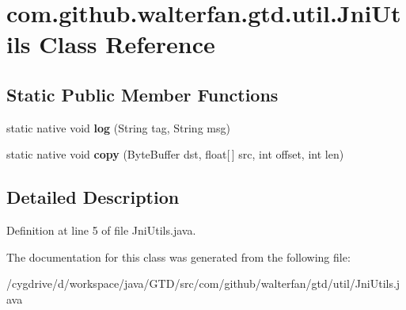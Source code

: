 \hypertarget{classcom_1_1github_1_1walterfan_1_1gtd_1_1util_1_1JniUtils}{\section{com.\-github.\-walterfan.\-gtd.\-util.\-Jni\-Utils Class Reference}
\label{classcom_1_1github_1_1walterfan_1_1gtd_1_1util_1_1JniUtils}
}
\subsection*{Static Public Member Functions}
\begin{DoxyCompactItemize}
\item 
\hypertarget{classcom_1_1github_1_1walterfan_1_1gtd_1_1util_1_1JniUtils_a976b186dac97a5ee527dcda412bafa83}{static native void {\bfseries log} (String tag, String msg)}\label{classcom_1_1github_1_1walterfan_1_1gtd_1_1util_1_1JniUtils_a976b186dac97a5ee527dcda412bafa83}

\item 
\hypertarget{classcom_1_1github_1_1walterfan_1_1gtd_1_1util_1_1JniUtils_a92c913d69cdf19bded99261014bf234f}{static native void {\bfseries copy} (Byte\-Buffer dst, float\mbox{[}$\,$\mbox{]} src, int offset, int len)}\label{classcom_1_1github_1_1walterfan_1_1gtd_1_1util_1_1JniUtils_a92c913d69cdf19bded99261014bf234f}

\end{DoxyCompactItemize}


\subsection{Detailed Description}


Definition at line 5 of file Jni\-Utils.\-java.



The documentation for this class was generated from the following file\-:\begin{DoxyCompactItemize}
\item 
/cygdrive/d/workspace/java/\-G\-T\-D/src/com/github/walterfan/gtd/util/Jni\-Utils.\-java\end{DoxyCompactItemize}
